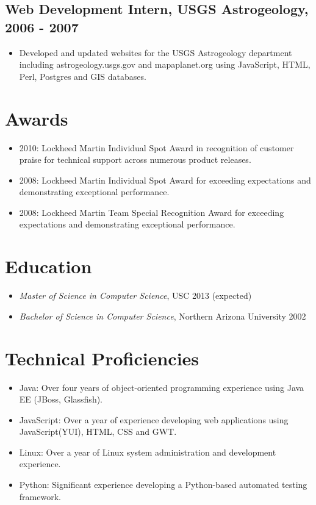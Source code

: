 \documentclass[11pt]{article}
\begin{document}
\subsection*{Web Development Intern, USGS Astrogeology, 2006 - 2007}
\label{sec-1.2}

\begin{itemize}
\item Developed and updated websites for the USGS Astrogeology department including astrogeology.usgs.gov and mapaplanet.org using JavaScript, HTML, Perl, Postgres and GIS databases.
\end{itemize}
\section*{Awards}
\label{sec-2}

\begin{itemize}
\item 2010: Lockheed Martin Individual Spot Award in recognition of customer praise for technical support across numerous product releases.
\item 2008: Lockheed Martin Individual Spot Award for exceeding expectations and demonstrating exceptional performance.
\item 2008: Lockheed Martin Team Special Recognition Award for exceeding expectations and demonstrating exceptional performance.
\end{itemize}
\section*{Education}
\label{sec-3}

\begin{itemize}
\item \emph{Master of Science in Computer Science}, USC 2013 (expected)
\item \emph{Bachelor of Science in Computer Science}, Northern Arizona University 2002
\end{itemize}
\section*{Technical Proficiencies}
\label{sec-4}

\begin{itemize}
\item Java: Over four years of object-oriented programming experience using Java EE (JBoss, Glassfish).
\item JavaScript: Over a year of experience developing web applications using JavaScript(YUI), HTML, CSS and GWT.
\item Linux: Over a year of Linux system administration and development experience.
\item Python: Significant experience developing a Python-based automated testing framework.
\end{itemize}
\end{document}
